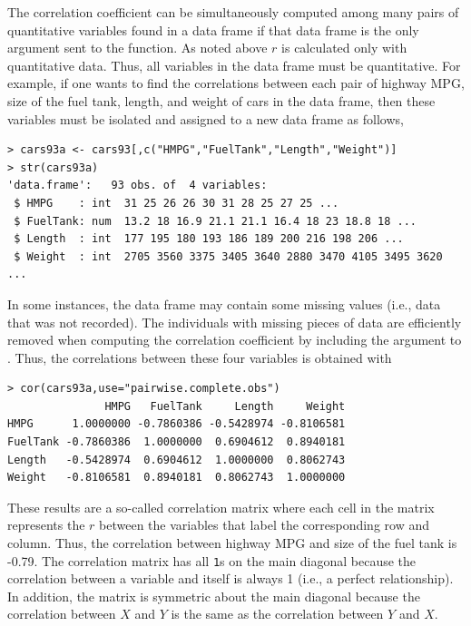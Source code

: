 \documentclass[10pt,openany]{book}\usepackage[]{graphicx}\usepackage[]{color}
\makeatletter
\newenvironment{kframe}{%
 \def\at@end@of@kframe{}%
 \ifinner\ifhmode%
  \def\at@end@of@kframe{\end{minipage}}%
  \begin{minipage}{\columnwidth}%
 \fi\fi%
 \def\FrameCommand##1{\hskip\@totalleftmargin \hskip-\fboxsep
 \colorbox{shadecolor}{##1}\hskip-\fboxsep
     \hskip-\linewidth \hskip-\@totalleftmargin \hskip\columnwidth}%
 \MakeFramed {\advance\hsize-\width
   \@totalleftmargin\z@ \linewidth\hsize
   \@setminipage}}%
 {\par\unskip\endMakeFramed%
 \at@end@of@kframe}
\newenvironment{knitrout}{}{} %
\makeatother
\begin{document}
The correlation coefficient can be simultaneously computed among many pairs of quantitative variables found in a data frame if that data frame is the only argument sent to the  function.  As noted above $r$ is calculated only with quantitative data.  Thus, all variables in the data frame must be quantitative.  For example, if one wants to find the correlations between each pair of highway MPG, size of the fuel tank, length, and weight of cars in the  data frame, then these variables must be isolated and assigned to a new data frame as follows,
\begin{knitrout}
\color{fgcolor}\begin{kframe}
\begin{verbatim}
> cars93a <- cars93[,c("HMPG","FuelTank","Length","Weight")]
> str(cars93a)
'data.frame':	93 obs. of  4 variables:
 $ HMPG    : int  31 25 26 26 30 31 28 25 27 25 ...
 $ FuelTank: num  13.2 18 16.9 21.1 21.1 16.4 18 23 18.8 18 ...
 $ Length  : int  177 195 180 193 186 189 200 216 198 206 ...
 $ Weight  : int  2705 3560 3375 3405 3640 2880 3470 4105 3495 3620 ...
\end{verbatim}
\end{kframe}
\end{knitrout}
In some instances, the data frame may contain some missing values (i.e., data that was not recorded).  The individuals with missing pieces of data are efficiently removed when computing the correlation coefficient by including the  argument to .  Thus, the correlations between these four variables is obtained with
\begin{knitrout}
\color{fgcolor}\begin{kframe}
\begin{verbatim}
> cor(cars93a,use="pairwise.complete.obs")
               HMPG   FuelTank     Length     Weight
HMPG      1.0000000 -0.7860386 -0.5428974 -0.8106581
FuelTank -0.7860386  1.0000000  0.6904612  0.8940181
Length   -0.5428974  0.6904612  1.0000000  0.8062743
Weight   -0.8106581  0.8940181  0.8062743  1.0000000
\end{verbatim}
\end{kframe}
\end{knitrout}
These results are a so-called correlation matrix where each cell in the matrix represents the $r$ between the variables that label the corresponding row and column.  Thus, the correlation between highway MPG and size of the fuel tank is -0.79.  The correlation matrix has all \verb"1"s on the main diagonal because the correlation between a variable and itself is always 1 (i.e., a perfect relationship).  In addition, the matrix is symmetric about the main diagonal because the correlation between $X$ and $Y$ is the same as the correlation between $Y$ and $X$.
\end{document}
